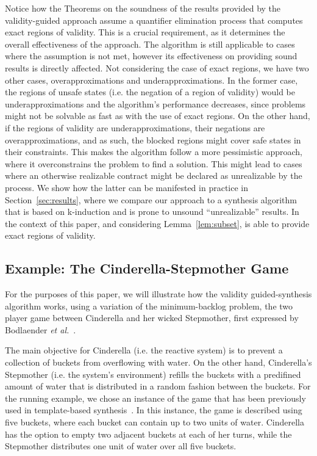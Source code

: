 Notice how the Theorems on the soundness of the results provided by the validity-guided approach assume a quantifier elimination process that computes exact regions of validity. This is a crucial requirement, as it determines the overall effectiveness of the approach. The algorithm is still applicable to cases where the assumption is not met, however its effectiveness on providing sound results is directly affected. Not considering the case of exact regions, we have two other cases, overapproximations and underapproximations. In the former case, the regions of unsafe states (i.e. the negation of a region of validity) would be underapproximations and the algorithm's performance decreases, since problems might not be solvable as fast as with the use of exact regions. On the other hand, if the regions of validity are underapproximations, their negations are overapproximations, and as such, the blocked regions might cover safe states in their constraints. This makes the algorithm follow a more pessimistic approach, where it overconstrains the problem to find a solution. This might lead to cases where an otherwise realizable contract might be declared as unrealizable by the process. We show how the latter can be manifested in practice in Section~\ref{sec:results}, where we compare our approach to a synthesis algorithm that is based on k-induction and is prone to unsound ``unrealizable'' results. In the context of this paper, and considering Lemma~\ref{lem:subset}, \aeval is able to provide exact regions of validity.

\subsection{Example: The Cinderella-Stepmother Game}
\label{sec:example}

For the purposes of this paper, we will illustrate how the validity
guided-synthesis algorithm works, using a variation of the minimum-backlog
problem, the two player game between Cinderella and her wicked
Stepmother, first  expressed by Bodlaender \textit{et
al.}~\cite{bodlaender2012cinderella}.

The main objective for Cinderella (i.e. the reactive system) is to prevent a
collection of buckets from overflowing with water. On the other hand,
Cinderella's Stepmother (i.e. the system's environment) refills the buckets with a predifined amount of water that is distributed in a random fashion between the buckets.
For the running example, we chose an instance of the game that has been
previously used in template-based synthesis~\cite{beyene2014constraint}. In this instance, the game is described
using five buckets, where each bucket can contain up to two units of water.
Cinderella has the option to empty two adjacent buckets at each of her turns,
while the Stepmother distributes one unit of water over all five buckets.


